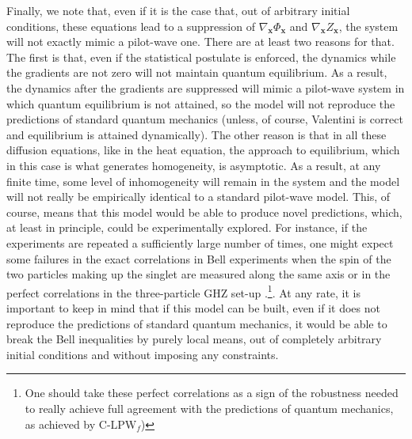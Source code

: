 \documentclass[letterpaper,12pt]{article}
\begin{document}
Finally, we note that, even if it is the case that, out of arbitrary initial conditions, these equations lead to a suppression of $\nabla_\mathbf{x} \Phi_\mathbf{x} $ and $\nabla_\mathbf{x} Z_\mathbf{x} $, the system will not exactly mimic a pilot-wave one. There are at least two reasons for that. The first is that, even if the statistical postulate is enforced, the dynamics while the gradients are not zero will not maintain quantum equilibrium. As a result, the dynamics after the gradients are suppressed will mimic a pilot-wave system in which quantum equilibrium is not attained, so the model will not reproduce the predictions of standard quantum mechanics (unless, of course, Valentini is correct and equilibrium is attained dynamically). The other reason is that in all these diffusion equations, like in the heat equation, the approach to equilibrium, which in this case is what generates homogeneity, is asymptotic. As a result, at any finite time, some level of inhomogeneity will remain in the system and the model will not really be empirically identical to a standard pilot-wave model. This, of course, means that this model would be able to produce novel predictions, which, at least in principle, could be experimentally explored. For instance, if the experiments are repeated a sufficiently large number of times, one might expect some failures in the exact correlations in Bell experiments when the spin of the two particles making up the singlet are measured along the same axis or in the perfect correlations in the three-particle GHZ set-up \cite{GHZ}.\footnote{One should take these perfect correlations as a sign of the robustness needed to really achieve full agreement with the predictions of quantum mechanics, as achieved by $\text{C-LPW}_f$)}. At any rate, it is important to keep in mind that if this model can be built, even if it does not reproduce the predictions of standard quantum mechanics, it would be able to break the Bell inequalities by purely local means, out of completely arbitrary initial conditions and without imposing any constraints.
\end{document}
